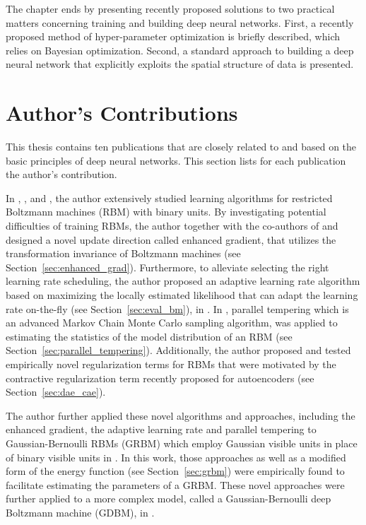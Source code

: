 \documentclass[dissertation,nocontribution,draft*]{aaltoseries}
\begin{document}
The chapter ends by presenting recently proposed solutions
to two practical matters concerning training and building
deep neural networks. First, a recently proposed method of
hyper-parameter optimization is briefly described, which
relies on Bayesian optimization. Second, a standard approach
to building a deep neural network that explicitly exploits
the spatial structure of data is presented.

\section{Author's Contributions}
\label{sec:contrib}

This thesis contains ten publications that are closely
related to and based on the basic principles of deep neural
networks.  This section lists for each publication the
author's contribution.

In \textbf{},
\textbf{},
\textbf{} and
\textbf{}, the
author extensively studied learning algorithms for
restricted Boltzmann machines (RBM) with binary units. By
investigating potential difficulties of training RBMs, the
author together with the co-authors of
and  designed a novel update
direction called enhanced gradient, that utilizes the
transformation invariance of Boltzmann machines (see
Section~\ref{sec:enhanced_grad}). Furthermore, to alleviate
selecting the right learning rate scheduling, the author
proposed an adaptive learning rate algorithm based on
maximizing the locally estimated likelihood that can adapt the learning
rate on-the-fly (see Section~\ref{sec:eval_bm}), in
. In
, parallel
tempering which is an advanced Markov Chain Monte Carlo
sampling algorithm, was applied to estimating the statistics
of the model distribution of an RBM (see
Section~\ref{sec:parallel_tempering}). Additionally, the
author proposed and tested empirically novel regularization
terms for RBMs that were motivated by the 
contractive regularization term recently proposed for autoencoders (see
Section~\ref{sec:dae_cae}).

The author further applied these novel algorithms and
approaches, including the enhanced gradient, the adaptive
learning rate and parallel tempering to Gaussian-Bernoulli
RBMs (GRBM) which employ Gaussian visible units in place of
binary visible units in \textbf{}. In this
work, those approaches as well as a modified form of the
energy function (see Section~\ref{sec:grbm}) were
empirically found to facilitate estimating the parameters of
a GRBM.  These novel approaches were further applied to a
more complex model, called a Gaussian-Bernoulli deep
Boltzmann machine (GDBM), in \textbf{}.
\end{document}

